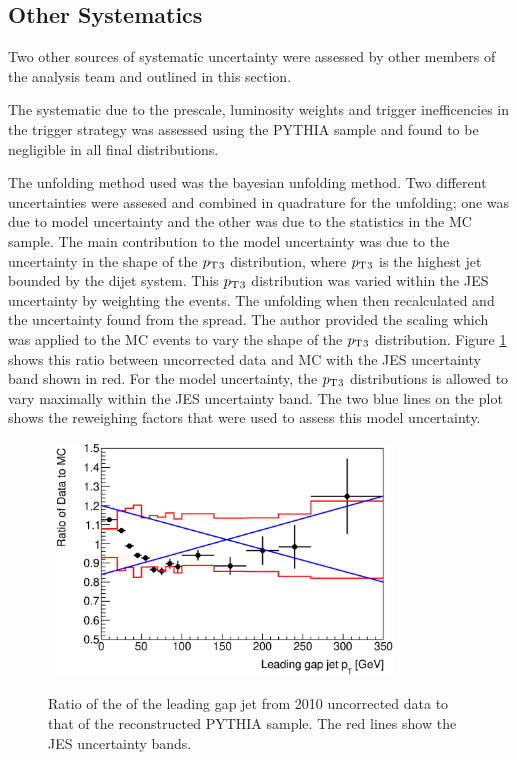 \subsection {Other Systematics}
Two other sources of systematic uncertainty were assessed  by other members of the analysis team and outlined in this section.

The systematic due to the prescale, luminosity weights and trigger inefficencies in the trigger strategy was assessed using the PYTHIA sample and found to be negligible in all final distributions.

The unfolding method used was the bayesian unfolding method.
Two different uncertainties were assesed and combined in quadrature for the unfolding; one was due to model uncertainty and the other was due to the statistics in the MC sample. 
The main contribution to the model uncertainty was due to the uncertainty in the shape of the $\mbox{$p_{\rm T}$}{}_3$ distribution, where $\mbox{$p_{\rm T}$}{}_3$ is the highest \pt{} jet bounded by the dijet system. 
This $\mbox{$p_{\rm T}$}{}_3$ distribution was varied within the JES uncertainty by weighting the events. 
The unfolding when then recalculated and the uncertainty found from the spread.
The author provided the scaling which was applied to the MC events to vary the shape of the $\mbox{$p_{\rm T}$}{}_3$ distribution.
Figure \ref{GBJ2:Uncorr:pt3} shows this ratio between uncorrected data and MC with the JES uncertainty band shown in red.
For the model uncertainty, the $\mbox{$p_{\rm T}$}{}_3$ distributions is allowed to vary maximally within the JES uncertainty band.
The two blue lines on the plot shows the reweighing factors that were used to assess this model uncertainty.
\begin{figure}
\centering
\mbox{
   \includegraphics[width=0.8\textwidth]{figures/GBJ2/ControlPlots/Ratio___pt3.eps}
}
\caption[Comparison of the data and PYTHIA for the \pt{} of the leading gap jet]{
Ratio of the \pt{} of the leading gap jet from 2010 uncorrected data to that of the reconstructed PYTHIA sample.
The red lines show the JES uncertainty bands.
\label{GBJ2:Uncorr:pt3}}
\end{figure}



